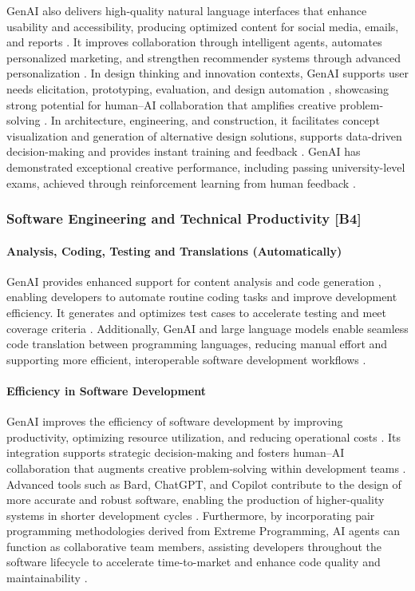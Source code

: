 GenAI also delivers high-quality natural language interfaces that enhance usability and accessibility, producing optimized content for social media, emails, and reports \parencite{R04}. It improves collaboration through intelligent agents, automates personalized marketing, and strengthen recommender systems through advanced personalization \parencite{R04}. In design thinking and innovation contexts, GenAI supports user needs elicitation, prototyping, evaluation, and design automation \parencite{R04}, showcasing strong potential for human–AI collaboration that amplifies creative problem-solving \parencite{R05,R06}. In architecture, engineering, and construction, it facilitates concept visualization and generation of alternative design solutions, supports data-driven decision-making and provides instant training and feedback \parencite{S15}. GenAI has demonstrated exceptional creative performance, including passing university-level exams, achieved through reinforcement learning from human feedback \parencite{S18,R07}.

\subsubsection{Software Engineering and Technical Productivity [B4]}
\paragraph{Analysis, Coding, Testing and Translations (Automatically)}
GenAI provides enhanced support for content analysis and code generation \parencite{R05}, enabling developers to automate routine coding tasks and improve development efficiency. It generates and optimizes test cases to accelerate testing and meet coverage criteria \parencite{S06}. Additionally, GenAI and large language models enable seamless code translation between programming languages, reducing manual effort and supporting more efficient, interoperable software development workflows \parencite{S06}.

\paragraph{Efficiency in Software Development}
GenAI improves the efficiency of software development by improving productivity, optimizing resource utilization, and reducing operational costs \parencite{R02}. Its integration supports strategic decision-making and fosters human–AI collaboration that augments creative problem-solving within development teams \parencite{R05}. Advanced tools such as Bard, ChatGPT, and Copilot contribute to the design of more accurate and robust software, enabling the production of higher-quality systems in shorter development cycles \parencite{S06}. Furthermore, by incorporating pair programming methodologies derived from Extreme Programming, AI agents can function as collaborative team members, assisting developers throughout the software lifecycle to accelerate time-to-market and enhance code quality and maintainability \parencite{S06}.

